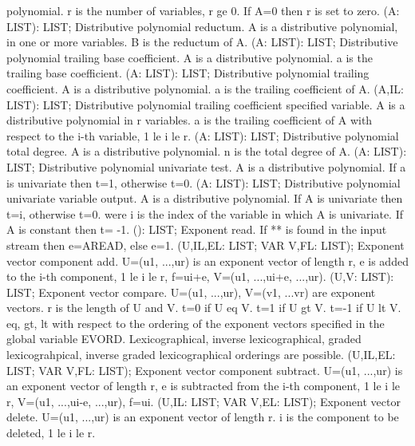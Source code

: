 polynomial. r is the number of variables, r ge 0. If A=0 then
r is set to zero.  \ecom 
{} (A: LIST): LIST; \eproc
\bcom Distributive polynomial reductum. A is a distributive polynomial,
in one or more variables. B is the reductum of A. \ecom 
{} (A: LIST): LIST; \eproc
\bcom Distributive polynomial trailing base coefficient. A is a
distributive polynomial. a is the trailing base coefficient. \ecom 
{} (A: LIST): LIST; \eproc
\bcom Distributive polynomial trailing coefficient. A is a
distributive polynomial. a is the trailing coefficient of A. \ecom 
{} (A,IL: LIST): LIST; \eproc
\bcom Distributive polynomial trailing coefficient specified variable.
A is a distributive polynomial in r variables. a is the
trailing coefficient of A with respect to the i-th variable,
1 le i le r.  \ecom 
{} (A: LIST): LIST; \eproc
\bcom Distributive polynomial total degree. A is a distributive
polynomial. n is the total degree of A. \ecom 
{} (A: LIST): LIST; \eproc
\bcom Distributive polynomial univariate test. A is a distributive
polynomial. If a is univariate then t=1, otherwise t=0. \ecom 
{} (A: LIST): LIST; \eproc
\bcom Distributive polynomial univariate variable output.
A is a distributive polynomial. If A is univariate then t=i, 
otherwise t=0. were i is the index of the variable in which A 
is univariate. If A is constant then t= -1.  \ecom 
{} (): LIST; \eproc
\bcom Exponent read. If ** is found in the input stream
then e=AREAD, else e=1.  \ecom 
{} (U,IL,EL: LIST; VAR V,FL: LIST); \eproc
\bcom Exponent vector component add. U=(u1, ...,ur) is an
exponent vector of length r, e is added to the i-th component,
1 le i le r, f=ui+e, V=(u1, ...,ui+e, ...,ur).  \ecom 
{} (U,V: LIST): LIST; \eproc
\bcom Exponent vector compare. U=(u1, ...,ur), V=(v1, ...vr)
are exponent vectors. r is the length of U and V.
t=0 if U eq V. t=1 if U gt V. t=-1 if U lt V. eq, gt, lt
with respect to the ordering of the exponent vectors specified
in the global variable EVORD. Lexicographical, inverse
lexicographical, graded lexicograhpical, inverse graded
lexicographical orderings are possible.  \ecom 
{} (U,IL,EL: LIST; VAR V,FL: LIST); \eproc
\bcom Exponent vector component subtract. U=(u1, ...,ur) is an
exponent vector of length r, e is subtracted from the i-th
component, 1 le i le r, V=(u1, ...,ui-e, ...,ur), f=ui.  \ecom 
{} (U,IL: LIST; VAR V,EL: LIST); \eproc
\bcom Exponent vector delete. U=(u1, ...,ur) is an exponent vector
of length r. i is the component to be deleted, 1 le i le r.
